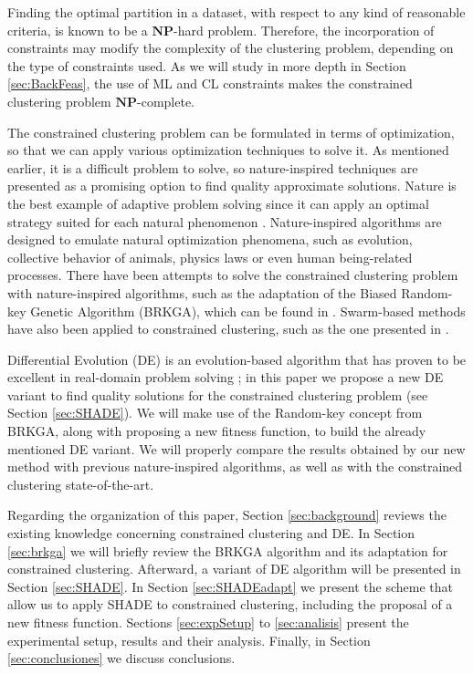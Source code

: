 \documentclass[review]{elsarticle}
\begin{document}
Finding the optimal partition in a dataset, with respect to any kind of reasonable criteria, is known to be a $\mathbf{NP}$-hard problem. Therefore, the incorporation of constraints may modify the complexity of the clustering problem, depending on the type of constraints used. As we will study in more depth in Section \ref{sec:BackFeas}, the use of ML and CL constraints makes the constrained clustering problem $\mathbf{NP}$-complete. \cite{davidson2005clustering}

The constrained clustering problem can be formulated in terms of optimization, so that we can apply various optimization techniques to solve it. As mentioned earlier, it is a difficult problem to solve, so nature-inspired techniques are presented as a promising option to find quality approximate solutions. Nature is the best example of adaptive problem solving since it can apply an optimal strategy suited for each natural phenomenon \cite{fausto2019ants}. Nature-inspired algorithms are designed to emulate natural optimization phenomena, such as evolution, collective behavior of animals, physics laws or even human being-related processes. There have been attempts to solve the constrained clustering problem with nature-inspired algorithms, such as the adaptation of the Biased Random-key Genetic Algorithm (BRKGA), which can be found in \cite{de2017comparison}. Swarm-based methods have also been applied to constrained clustering, such as the one presented in \cite{xu2013improving}.

Differential Evolution (DE) is an evolution-based algorithm that has proven to be excellent in real-domain problem solving \cite{das2011differential}; in this paper we propose a new DE variant to find quality solutions for the constrained clustering problem (see Section \ref{sec:SHADE}). We will make use of the Random-key concept from BRKGA, along with proposing a new fitness function, to build the already mentioned DE variant. We will properly compare the results obtained by our new method with previous nature-inspired algorithms, as well as with the constrained clustering state-of-the-art.

Regarding the organization of this paper, Section \ref{sec:background} reviews the existing knowledge concerning constrained clustering and DE. In Section \ref{sec:brkga} we will briefly review the BRKGA algorithm and its adaptation for constrained clustering. Afterward, a variant of DE algorithm will be presented in Section \ref{sec:SHADE}. In Section \ref{sec:SHADEadapt} we present the scheme that allow us to apply SHADE to constrained clustering, including the proposal of a new fitness function. Sections \ref{sec:expSetup} to \ref{sec:analisis} present the experimental setup, results and their analysis. Finally, in Section \ref{sec:conclusiones} we discuss conclusions.
\end{document}
